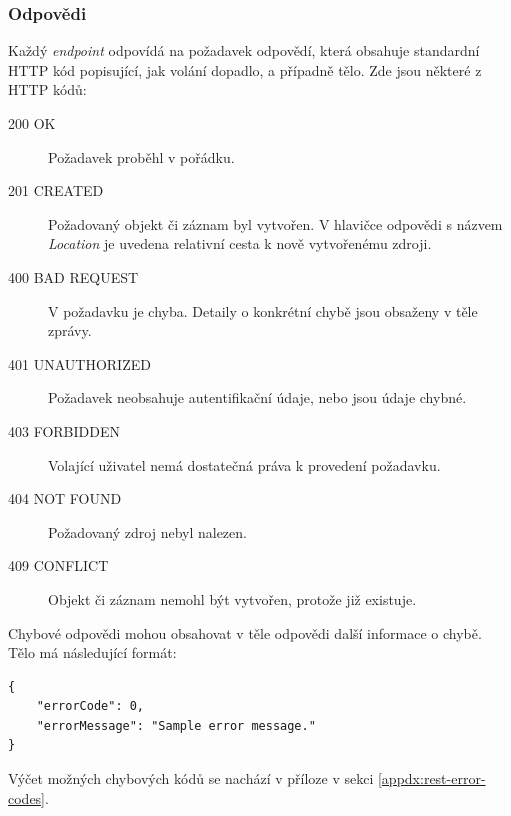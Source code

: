 \documentclass[thesis=B,czech]{FITthesis}[2012/06/26]
\begin{document}
			\subsubsection{Odpovědi}
			\label{sec:responses}
			Každý \textit{endpoint} odpovídá na požadavek odpovědí, která obsahuje standardní HTTP kód popisující, jak volání dopadlo, a případně tělo. Zde jsou některé z HTTP kódů:
			\begin{description}
				\item[200 OK] Požadavek proběhl v pořádku.
				\item[201 CREATED] Požadovaný objekt či záznam byl vytvořen. V hlavičce odpovědi s názvem \textit{Location} je uvedena relativní cesta k nově vytvořenému zdroji.
				\item[400 BAD REQUEST] V požadavku je chyba. Detaily o konkrétní chybě jsou obsaženy v těle zprávy.
				\item[401 UNAUTHORIZED] Požadavek neobsahuje autentifikační údaje, nebo jsou údaje chybné.
				\item[403 FORBIDDEN] Volající uživatel nemá dostatečná práva k provedení požadavku.
				\item[404 NOT FOUND] Požadovaný zdroj nebyl nalezen.
				\item[409 CONFLICT] Objekt či záznam nemohl být vytvořen, protože již existuje.
			\end{description}
			Chybové odpovědi mohou obsahovat v těle odpovědi další informace o chybě. Tělo má následující formát:
				\begin{Verbatim}[obeytabs,tabsize=2]
{
	"errorCode": 0,
	"errorMessage": "Sample error message."
}
				\end{Verbatim}
				Výčet možných chybových kódů se nachází v příloze v sekci \ref{appdx:rest-error-codes}.
			
			\hfill \\
			
			
\end{document}
